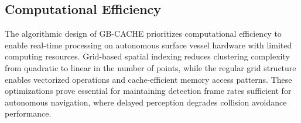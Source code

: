 \documentclass[../main.tex]{subfiles}
\begin{document}





\subsection{Computational Efficiency} \label{sec:gbcache_efficiency}

The algorithmic design of \ac{GB-CACHE} prioritizes computational efficiency to enable real-time processing on autonomous surface vessel hardware with limited computing resources.
Grid-based spatial indexing reduces clustering complexity from quadratic to linear in the number of points, while the regular grid structure enables vectorized operations and cache-efficient memory access patterns.
These optimizations prove essential for maintaining detection frame rates sufficient for autonomous navigation, where delayed perception degrades collision avoidance performance.
\end{document}
